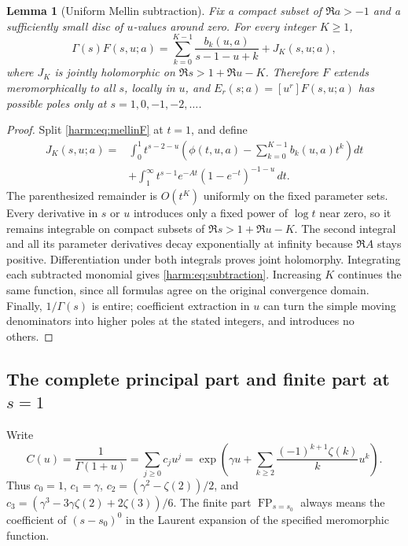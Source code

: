 \documentclass[11pt,letterpaper]{article}
\numberwithin{equation}{section}
\theoremstyle{plain}
\newtheorem{lemma}[theorem]{Lemma}
\theoremstyle{definition}
\theoremstyle{remark}
\begin{document}
\begin{lemma}[Uniform Mellin subtraction]\label{harm:lem:subtract}
Fix a compact subset of $\Re a>-1$ and a sufficiently small disc of
$u$-values around zero.  For every integer $K\geq1$,
\begin{equation}\label{harm:eq:subtraction}
 \Gamma(s)F(s,u;a)
   =\sum_{k=0}^{K-1}\frac{b_k(u,a)}{s-1-u+k}
       +J_K(s,u;a),
\end{equation}
where $J_K$ is jointly holomorphic on
$\Re s>1+\Re u-K$.  Therefore $F$ extends meromorphically to all
$s$, locally in $u$, and $E_r(s;a)=[u^r]F(s,u;a)$ has possible
poles only at $s=1,0,-1,-2,\ldots$.
\end{lemma}
\begin{proof}
Split \eqref{harm:eq:mellinF} at $t=1$, and define
\begin{align*}
 J_K(s,u;a)={}&\int_0^1 t^{s-2-u}
       \left(\phi(t,u,a)-\sum_{k=0}^{K-1}b_k(u,a)t^k\right)dt\\
 &+\int_1^{\infty}t^{s-1}e^{-At}
                  (1-e^{-t})^{-1-u}\,dt.
\end{align*}
The parenthesized remainder is $O(t^K)$ uniformly on the fixed
parameter sets.  Every derivative in $s$ or $u$ introduces only a
fixed power of $\log t$ near zero, so it remains integrable on compact
subsets of $\Re s>1+\Re u-K$.  The second integral and all its
parameter derivatives decay exponentially at infinity because
$\Re A$ stays positive.  Differentiation under both integrals proves
joint holomorphy.  Integrating each subtracted monomial gives
\eqref{harm:eq:subtraction}.  Increasing $K$ continues the same
function, since all formulas agree on the original convergence
domain.  Finally, $1/\Gamma(s)$ is entire; coefficient extraction
in $u$ can turn the simple moving denominators into higher poles
at the stated integers, and introduces no others.
\end{proof}

\subsection{The complete principal part and finite part at \texorpdfstring{$s=1$}{s=1}}

Write
\begin{equation}\label{harm:eq:c}
 C(u)=\frac1{\Gamma(1+u)}=\sum_{j\geq0}c_ju^j
 =\exp\left(\gamma u+
       \sum_{k\geq2}\frac{(-1)^{k+1}\zeta(k)}k u^k\right).
\end{equation}
Thus $c_0=1$, $c_1=\gamma$,
$c_2=(\gamma^2-\zeta(2))/2$, and
$c_3=(\gamma^3-3\gamma\zeta(2)+2\zeta(3))/6$.
The finite part $\operatorname{FP}_{s=s_0}$ always means the
coefficient of $(s-s_0)^0$ in the Laurent expansion of the specified
meromorphic function.
\end{document}
